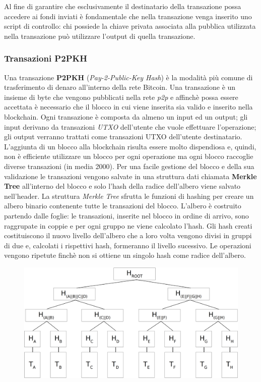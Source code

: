 \begin{enumerate}[1.]
Al fine di garantire che esclusivamente il destinatario della transazione possa accedere ai fondi inviati è fondamentale che nella transazione venga inserito uno script di controllo: chi possiede la chiave privata associata alla pubblica utilizzata nella transazione può utilizzare l'output di quella transazione.

\subsubsection{Transazioni P2PKH}\label{sec:transazione}
Una transazione \textbf{P2PKH} (\textit{Pay-2-Public-Key Hash}) è la modalità più comune di trasferimento di denaro all'interno della rete Bitcoin.
Una transazione è un insieme di byte che vengono pubblicati nella rete \textit{p2p} e affinchè possa essere accettata è necessario che il blocco in cui viene inserita sia valido e inserito nella blockchain.
Ogni transazione è composta da almeno un input ed un output; gli input derivano da transazioni \textit{UTXO} dell'utente che vuole effettuare l'operazione; gli output verranno trattati come transazioni UTXO dell'utente destinatario.\newline
L'aggiunta di un blocco alla blockchain risulta essere molto dispendiosa e, quindi, non è efficiente utilizzare un blocco per ogni operazione ma ogni blocco raccoglie diverse transazioni (in media 2000). Per una facile gestione del blocco e della sua validazione le transazioni vengono salvate in una struttura dati chiamata \textbf{Merkle Tree} all'interno del blocco e solo l'hash della radice dell'albero viene salvato nell'header.\newline
La struttura \textit{Merkle Tree} sfrutta le funzioni di hashing per creare un albero binario contenente tutte le transazioni del blocco.\newline
L'albero è costruito partendo dalle foglie: le transazioni, inserite nel blocco in ordine di arrivo, sono raggrupate in coppie e per ogni gruppo ne viene calcolato l'hash. Gli hash creati costituiscono il nuovo livello dell'albero che a loro volta vengono divisi in gruppi di due e, calcolati i rispettivi hash, formeranno il livello sucessivo.
Le operazioni vengono ripetute finchè non si ottiene un singolo hash come radice dell'albero.\newline
\begin{figure}
    \centering
    \includegraphics[width=\textwidth]{./images/merkle.png}

\end{figure}
\end{enumerate}
